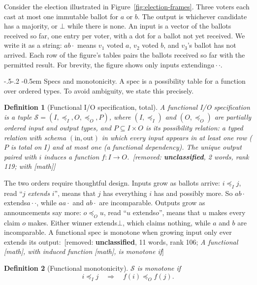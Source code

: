 \documentclass[sigconf]{cidr-2027}
\makeatletter
\newtheorem{definition}{Definition}
\theoremstyle{remark}
\renewcommand\paragraph{\@startsection{paragraph}{4}{\z@}%
  {-.5\baselineskip \@plus -2\p@ \@minus -.2\p@}%
  {-0.5em}%
  {\normalfont\bfseries}}
\newcommand{\InputOrd}{\preceq_I}
\newcommand{\OutputOrd}{\preceq_O}
\newcommand{\inrel}{extends\xspace}          %
\newcommand{\inrelpart}{extending\xspace}    %
\newcommand{\outrel}{extends\xspace}          %
\newcommand{\Spec}{\mathcal{S}}
\newcommand{\spectype}[1][]{I/O specification#1\xspace}
\newcommand{\removednote}[1]{{\color{cutred}\footnotesize\,[removed: #1]\,}}
\makeatother
\begin{document}
Consider the election illustrated in
Figure~\ref{fig:election-frames}. Three voters each cast at most one immutable
ballot for $a$ or $b$. The output is whichever candidate has a majority, or
$\bot$ while there is none. An input is a vector of the ballots received so
far, one entry per voter, with a dot for a ballot not yet received. We write
it as a string: $ab\cdot$ means $v_1$ voted $a$, $v_2$ voted $b$, and $v_3$'s
ballot has not arrived. Each row of the figure's tables pairs the ballots
received so far with the permitted result. For brevity, the figure shows only
inputs \inrelpart $a\cdot\cdot$.

\paragraph{Specs and monotonicity.}
A spec is a possibility table for a function over ordered types. To avoid ambiguity, we state this precisely.

\begin{definition}[Functional \spectype, total]
\label{def:functional-specification}
\textcolor{newblue}{A \emph{functional \spectype} is a tuple
$\Spec=(I,\InputOrd,O,\OutputOrd,P)$,
where $(I,\InputOrd)$ and $(O,\OutputOrd)$ are partially ordered input and
output types, and $P\subseteq I\times O$ is its \emph{possibility relation}:
a typed relation with schema $(\mathrm{in},\mathrm{out})$ in which every
input appears in at least one row ($P$ is \emph{total} on $I$) and at most one
(a functional dependency).} \textcolor{newblue}{The unique output paired with $i$ induces a
function $f:I\to O$.} \removednote{\textbf{unclassified}, 2 words, rank 119; \textit{with [math]}}
\end{definition}

The two orders require thoughtful design. Inputs grow as ballots arrive: $i\InputOrd j$, read ``$j$ \emph{\inrel} $i$'', means that
$j$ has everything $i$ has and possibly more. So $ab\cdot$ \inrel $a\cdot\cdot$,
while $aa\cdot$ and $ab\cdot$ are incomparable. Outputs grow as announcements
say more: $o\OutputOrd u$, read ``$u$ \outrel $o$'', means that $u$ makes every
claim $o$ makes. Either winner \outrel $\bot$, which claims nothing, while $a$
and $b$ are incomparable. A functional spec is monotone when growing input only
ever extends its output: \removednote{\textbf{unclassified}, 11 words, rank 106; \textit{A functional [math], with induced function [math], is monotone if}}

\begin{definition}[Functional monotonicity]
\label{def:functional-monotonicity}
\textcolor{newblue}{$\Spec$ is \emph{monotone} if}
\begin{equation}
  i\InputOrd j
  \quad\Longrightarrow\quad
  f(i)\OutputOrd f(j).
  \label{eq:functional-monotonicity}
\end{equation}
\end{definition}
\end{document}
